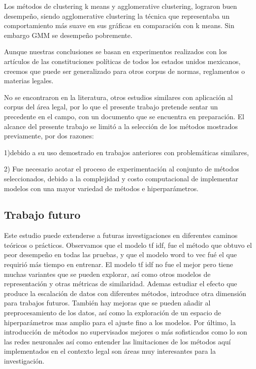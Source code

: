 \documentclass[12pt]{article}
\begin{document}
		Los métodos de clustering k means y agglomerative clustering, lograron buen desempeño, siendo agglomerative clustering la técnica que representaba un comportamiento más suave en sus gráficas en comparación con k means. Sin embargo GMM se desempeño pobremente.
		
		Aunque nuestras conclusiones se basan en experimentos realizados con los artículos de las constituciones políticas de todos los estados unidos mexicanos, creemos que puede ser generalizado para otros corpus de normas, reglamentos o materias legales.
		
		No se encontraron en la literatura, otros estudios similares con aplicación al corpus del área legal, por lo que el presente trabajo pretende sentar un precedente en el campo, con un documento que se encuentra en preparación.
		El alcance del presente trabajo se limitó a la selección de los métodos mostrados previamente, por dos razones: 
		
		1)debido a su uso demostrado en trabajos anteriores con problemáticas similares, 
		
		2) Fue necesario acotar el proceso de experimentación al conjunto de métodos seleccionados,  debido a la complejidad y costo computacional de implementar modelos con una mayor variedad de métodos e hiperparámetros.
		
	\subsection{Trabajo futuro}
	
	
		Este estudio puede extenderse a futuras investigaciones en diferentes caminos teóricos o prácticos. Observamos que el modelo tf idf, fue el método que obtuvo el peor desempeño en todas las pruebas, y que el modelo word to vec fué el que requirió más tiempo en entrenar. El modelo tf idf no fue el mejor pero tiene muchas variantes que se pueden explorar, así como otros modelos de representación y otras métricas de similaridad. Ademas estudiar el efecto que produce la escalación de datos con diferentes métodos, introduce otra dimensión para trabajos futuros. 
		También hay mejoras que se pueden añadir al preprocesamiento de los datos, así como la exploración de un espacio de hiperparámetros mas amplio para el ajuste fino a los modelos. 
		Por último, la introducción de métodos no supervisados mejores o más sofisticados como lo son las redes neuronales así como entender las limitaciones de los métodos aquí implementados en el contexto legal son áreas muy interesantes para la investigación.
		
\end{document}
